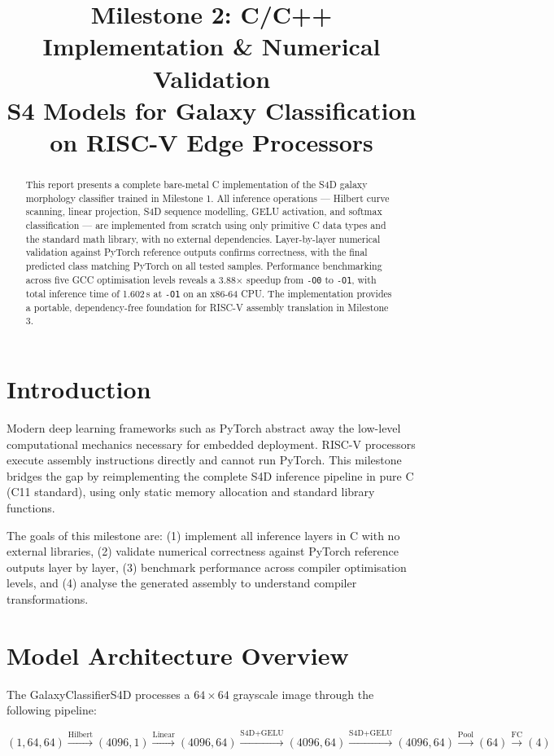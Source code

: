 \documentclass[conference]{IEEEtran}
\title{Milestone 2: C/C++ Implementation \& Numerical Validation\\
{\large S4 Models for Galaxy Classification on RISC-V Edge Processors}}
\author{
\IEEEauthorblockN{Team Echo Theory}
\IEEEauthorblockA{GitHub: \url{https://github.com/kaiD-ops/caal2026}}
}
\begin{document}
\maketitle

\begin{abstract}
This report presents a complete bare-metal C implementation of the S4D galaxy
morphology classifier trained in Milestone 1. All inference operations ---
Hilbert curve scanning, linear projection, S4D sequence modelling, GELU
activation, and softmax classification --- are implemented from scratch using
only primitive C data types and the standard math library, with no external
dependencies. Layer-by-layer numerical validation against PyTorch reference
outputs confirms correctness, with the final predicted class matching PyTorch
on all tested samples. Performance benchmarking across five GCC optimisation
levels reveals a 3.88$\times$ speedup from \texttt{-O0} to \texttt{-O1},
with total inference time of 1.602\,s at \texttt{-O1} on an x86-64 CPU.
The implementation provides a portable, dependency-free foundation for
RISC-V assembly translation in Milestone 3.
\end{abstract}

\section{Introduction}
Modern deep learning frameworks such as PyTorch abstract away the low-level
computational mechanics necessary for embedded deployment. RISC-V processors
execute assembly instructions directly and cannot run PyTorch. This milestone
bridges the gap by reimplementing the complete S4D inference pipeline in pure
C (C11 standard), using only static memory allocation and standard library
functions.

The goals of this milestone are: (1) implement all inference layers in C with
no external libraries, (2) validate numerical correctness against PyTorch
reference outputs layer by layer, (3) benchmark performance across compiler
optimisation levels, and (4) analyse the generated assembly to understand
compiler transformations.

\section{Model Architecture Overview}
The GalaxyClassifierS4D processes a $64\times64$ grayscale image through
the following pipeline:

\begin{equation}
(1,64,64) \xrightarrow{\text{Hilbert}} (4096,1) \xrightarrow{\text{Linear}}
(4096,64) \xrightarrow{\text{S4D+GELU}} (4096,64) \xrightarrow{\text{S4D+GELU}}
(4096,64) \xrightarrow{\text{Pool}} (64) \xrightarrow{\text{FC}} (4)
\end{equation}
\end{document}
